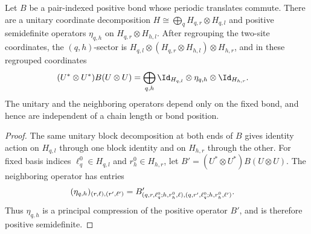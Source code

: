 \begin{lemma}
    \label{thm:mpdo_commuting_bond_positive_eta_decomposition}
    \leanok
    Let $B$ be a pair-indexed positive bond whose periodic translates commute.
    There are a unitary coordinate decomposition
    $H\cong\bigoplus_q H_{q,r}\otimes H_{q,l}$
    and positive semidefinite operators
    $\eta_{q,h}$ on $H_{q,r}\otimes H_{h,l}$. After regrouping the
    two-site coordinates, the $(q,h)$-sector is
    $H_{q,l}\otimes(H_{q,r}\otimes H_{h,l})\otimes H_{h,r}$,
    and in these regrouped coordinates
    \begin{align}
        (U^*\otimes U^*)B(U\otimes U)
         & =\bigoplus_{q,h}
        \Id_{H_{q,l}}\otimes\eta_{q,h}\otimes\Id_{H_{h,r}}.
        \notag
    \end{align}
    The unitary and the neighboring operators depend only on the fixed bond,
    and hence are independent of a chain length or bond position.
\end{lemma}

\begin{proof}\leanok
    The same unitary block decomposition at both ends of $B$ gives identity
    action on $H_{q,l}$ through one block identity and on $H_{h,r}$ through
    the other. For fixed basis indices
    $\ell_q^0\in H_{q,l}$ and $r_h^0\in H_{h,r}$, let
    $B'=(U^*\otimes U^*)B(U\otimes U)$. The neighboring operator has entries
    \begin{align}
        (\eta_{q,h})_{(r,\ell),(r',\ell')}
         & =
        B'_{(q,r,\ell_q^0;h,r_h^0,\ell),
                (q,r',\ell_q^0;h,r_h^0,\ell')}.
        \notag
    \end{align}
    Thus $\eta_{q,h}$ is a principal compression of the positive operator
    $B'$, and is therefore positive semidefinite.
\end{proof}

